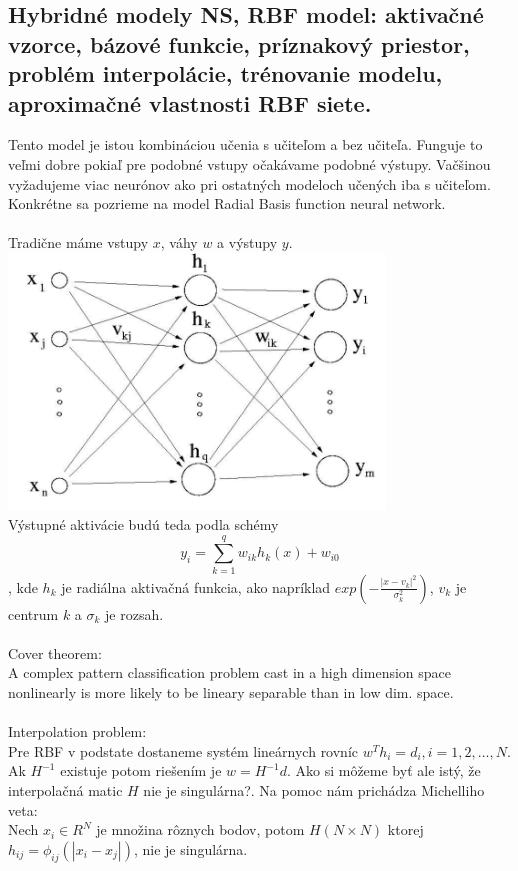 \documentclass{article}
\numberwithin{equation}{section} %
\begin{document}
\subsection{Hybridné modely NS, RBF model: aktivačné vzorce, bázové funkcie, príznakový priestor, problém interpolácie, trénovanie modelu, aproximačné vlastnosti RBF siete.}
Tento model je istou kombináciou učenia s učiteľom a bez učiteľa. Funguje to veľmi dobre pokiaľ pre podobné vstupy očakávame podobné výstupy. Vačšinou vyžadujeme viac neurónov ako pri ostatných modeloch učených iba s učiteľom. Konkrétne sa pozrieme na model Radial Basis function neural network.
\\\\
Tradične máme vstupy $x$, váhy $w$ a výstupy $y$.\\
\includegraphics[width=10cm]{imgs/rbf}\\
Výstupné aktivácie budú teda podla schémy
 $$y_i = \sum^q_{k=1}w_{ik}h_k(x) + w_{i0} $$, kde $h_k$ je radiálna aktivačná funkcia, ako napríklad $exp(-\frac{|x-v_k|^2}{\sigma_k^2})$, $v_k$ je centrum $k$ a $\sigma_k$ je rozsah. 
\\\\
Cover theorem: \\
A complex pattern classification problem cast in a high dimension space nonlinearly is more likely to be lineary separable than in low dim. space.
\\\\
Interpolation problem:\\
Pre RBF v podstate dostaneme systém lineárnych rovníc $w^Th_i = d_i, i=1,2,\dots,N$. Ak $H^{-1}$ existuje potom riešením je $w = H^{-1}d$. Ako si môžeme byť ale istý, že interpolačná matic $H$ nie je singulárna?. Na pomoc nám prichádza Michelliho veta: \\

Nech $x_i \in R^N$ je množina rôznych bodov, potom $H(N\times N)$ ktorej $h_{ij} = \phi_{ij}(|x_i - x_j|)$, nie je singulárna. 
\end{document}
